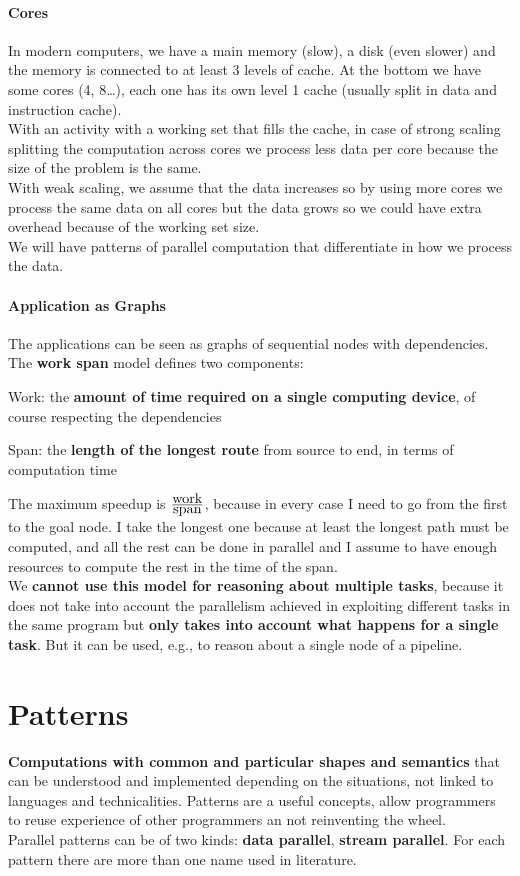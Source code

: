 \documentclass[10pt]{report}
\begin{document}
\paragraph{Cores} In modern computers, we have a main memory (slow), a disk (even slower) and the memory is connected to at least 3 levels of cache. At the bottom we have some cores (4, 8\ldots), each one has its own level 1 cache (usually split in data and instruction cache).\\
With an activity with a working set that fills the cache, in case of strong scaling splitting the computation across cores we process less data per core because the size of the problem is the same.\\
With weak scaling, we assume that the data increases so by using more cores we process the same data on all cores but the data grows so we could have extra overhead because of the working set size.\\
We will have patterns of parallel computation that differentiate in how we process the data.
\paragraph{Application as Graphs} The applications can be seen as graphs of sequential nodes with dependencies. The \textbf{work span} model defines two components:
\begin{list}{}{}
	\item Work: the \textbf{amount of time required on a single computing device}, of course respecting the dependencies
	\item Span: the \textbf{length of the longest route} from source to end, in terms of computation time
\end{list}
The maximum speedup is $\frac{\hbox{work}}{\hbox{span}}$, because in every case I need to go from the first to the goal node. I take the longest one because at least the longest path must be computed, and all the rest can be done in parallel and I assume to have enough resources to compute the rest in the time of the span.\\
We \textbf{cannot use this model for reasoning about multiple tasks}, because it does not take into account the parallelism achieved in exploiting different tasks in the same program but \textbf{only takes into account what happens for a single task}. But it can be used, e.g., to reason about a single node of a pipeline.
\section{Patterns}
\textbf{Computations with common and particular shapes and semantics} that can be understood and implemented depending on the situations, not linked to languages and technicalities. Patterns are a useful concepts, allow programmers to reuse experience of other programmers an not reinventing the wheel.\\
Parallel patterns can be of two kinds: \textbf{data parallel}, \textbf{stream parallel}. For each pattern there are more than one name used in literature.
\end{document}
